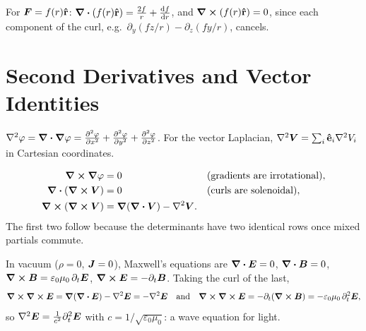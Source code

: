 \begin{example}
For $\vect{F} = f(r)\rhat$: $\div(f(r)\boldsymbol{\hat{\textbf{r}}}) = \frac{2f}{r} + \dv{f}{r}$, and $\curl(f(r)\boldsymbol{\hat{\textbf{r}}}) = 0$, since each component of the curl, e.g.\ $\partial_y(fz/r) - \partial_z(fy/r)$, cancels.
\end{example}

\section{Second Derivatives and Vector Identities}

\begin{definition}[Laplacian]
$\laplacian\varphi = \div\grad\varphi = \pdv[2]{\varphi}{x}+\pdv[2]{\varphi}{y}+\pdv[2]{\varphi}{z}$. For the vector Laplacian, $\laplacian\vect{V} = \sum_i\uvect{e}_i\laplacian V_i$ in Cartesian coordinates.
\end{definition}

\begin{fact}
\begin{align*}
    \curl\grad\varphi &= 0 &&\text{(gradients are irrotational)},\\
    \div(\curl\vect{V}) &= 0 &&\text{(curls are solenoidal)},\\
    \curl(\curl\vect{V}) &= \grad(\div\vect{V}) - \laplacian\vect{V}.
\end{align*}
The first two follow because the determinants have two identical rows once mixed partials commute.
\end{fact}

\begin{example}
In vacuum ($\rho = 0$, $\vect{J} = 0$), Maxwell's equations are $\div\vect{E} = 0$, $\div\vect{B} = 0$, $\curl\vect{B} = \varepsilon_0\mu_0\,\partial_t\vect{E}$, $\curl\vect{E} = -\partial_t\vect{B}$. Taking the curl of the last,
\[
    \curl\curl\vect{E} = \grad(\div\vect{E}) - \laplacian\vect{E} = -\laplacian\vect{E}
    \quad\text{and}\quad
    \curl\curl\vect{E} = -\partial_t(\curl\vect{B}) = -\varepsilon_0\mu_0\,\partial_t^2\vect{E},
\]
so $\laplacian\vect{E} = \frac{1}{c^2}\partial_t^2\vect{E}$ with $c = 1/\sqrt{\varepsilon_0\mu_0}$: a wave equation for light.
\end{example}

